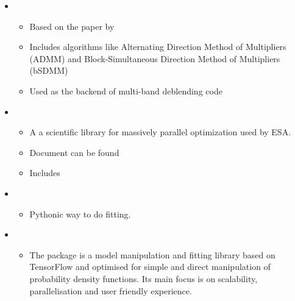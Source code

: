 \documentclass[letterpaper,10pt,english]{sphinxmanual}
\begin{document}
\begin{itemize}
\begin{itemize}
\end{itemize}

\item {} 
\begin{itemize}
\item {} 
Based on the paper by 

\item {} 
Includes algorithms like Alternating Direction Method of
Multipliers (ADMM) and Block-Simultaneous Direction Method of
Multipliers (bSDMM)

\item {} 
Used as the backend of multi-band deblending code

\end{itemize}

\item {} 
\begin{itemize}
\item {} 
A a scientific library for massively parallel optimization used by
ESA.

\item {} 
Document can be found 

\item {} 
Includes 

\end{itemize}

\item {} 
\begin{itemize}
\item {} 
Pythonic way to do fitting.

\end{itemize}

\item {} 
\begin{itemize}
\item {} 
The  package is a model manipulation and fitting library
based on TensorFlow and optimised for simple and direct
manipulation of probability density functions. Its main focus is
on scalability, parallelisation and user friendly experience.

\end{itemize}

\end{itemize}
\end{document}
